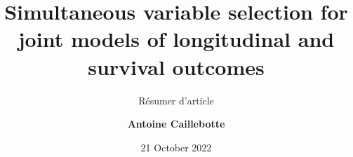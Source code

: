 \documentclass[10pt,xcolor={dvipsnames}]{beamer}
\author[Antoine \textrm{Caillebotte}]
{\bf{Antoine \textrm{Caillebotte}\inst{1}}}
\institute[Université Paris-Saclay, INRAE]
{
  \inst{1} Université Paris-Saclay, INRAE, MaIAGE
}
\title{Simultaneous variable selection for joint models of longitudinal and survival outcomes}
\subtitle{Résumer d'article}
\date{21 October 2022}
\begin{document}
    \printtitlepage
\end{document}
